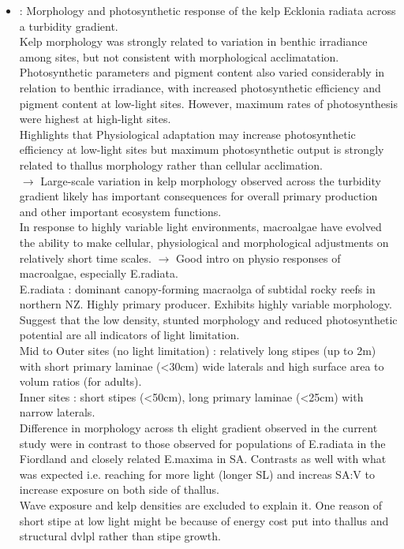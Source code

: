 \documentclass[]{report}
\begin{document}
\begin{itemize}
		\item \cite{blain2019morphology} : Morphology and photosynthetic response of the kelp Ecklonia radiata across a turbidity gradient.
		\\ Kelp morphology was strongly related to variation in benthic irradiance among sites, but not consistent with morphological acclimatation.
		\\ Photosynthetic parameters and pigment content also varied considerably in relation to benthic irradiance, with increased photosynthetic efficiency  and pigment content at low-light sites. However, maximum rates of photosynthesis were highest at high-light sites.
		\\ Highlights that Physiological adaptation may increase photosynthetic efficiency at low-light sites but maximum photosynthetic output is strongly related to thallus morphology rather than cellular acclimation.
		\\ $\rightarrow$ Large-scale variation in kelp morphology observed across the turbidity gradient likely has important consequences for overall primary production and other important ecosystem functions. 
		\\ In response to highly variable light environments, macroalgae have evolved the ability to make cellular, physiological and morphological adjustments on relatively short time scales. $\rightarrow$ Good intro on physio responses of macroalgae, especially E.radiata.
		\\ E.radiata : dominant canopy-forming macraolga of subtidal rocky reefs in northern NZ. Highly primary producer. Exhibits highly variable morphology.
		\\ Suggest that the low density, stunted morphology and reduced photosynthetic potential are all indicators of light limitation.
		\\ Mid to Outer sites (no light limitation) : relatively long stipes (up to 2m) with short primary laminae (<30cm) wide laterals and high surface area to volum ratios (for adults).
		\\ Inner sites : short stipes (<50cm), long primary laminae (<25cm) with narrow laterals.
		\\Difference in morphology across th elight gradient observed in the current study were in contrast to those observed for populations of E.radiata in the Fiordland and closely related E.maxima in SA. Contrasts as well with what was expected i.e. reaching for more light (longer SL) and increas SA:V to increase exposure on both side of thallus.
		\\Wave exposure and kelp densities are excluded to explain it. One reason of short stipe at low light might be because of energy cost put into thallus and structural dvlpl rather than stipe growth.

\end{itemize}
\end{document}
